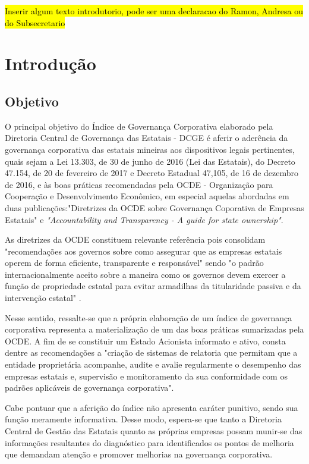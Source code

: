 \hl{Inserir algum texto introdutorio, pode ser uma declaracao do Ramon, Andresa ou do Subsecretario}
	
	
\chapter{Introdução}
\label{chp:intro}
	
\section{Objetivo}
	
O principal objetivo do Índice de Governança Corporativa elaborado pela Diretoria Central de Governança das Estatais - DCGE é aferir o aderência da governança corporativa das estatais mineiras aos dispositivos legais pertinentes, quais sejam a Lei 13.303, de 30 de junho de 2016 (Lei das Estatais), do Decreto 47.154, de 20 de fevereiro de 2017 e Decreto Estadual 47,105, de 16 de dezembro de 2016, e às boas práticas recomendadas pela OCDE - Organização para Cooperação e Desenvolvimento Econômico, em especial aquelas abordadas em duas publicações:"Diretrizes da OCDE sobre Governança Coporativa de Empresas Estatais" e \textit{"Accountability and Transparency - A guide for state ownership"}.
	
As diretrizes da OCDE constituem relevante referência pois consolidam "recomendações aos governos sobre como assegurar que as empresas estatais operem de forma eficiente, transparente e responsável" sendo "o padrão internacionalmente aceito sobre a maneira como os governos devem exercer a função de propriedade estatal para evitar armadilhas da titularidade passiva e da intervenção estatal" \citep[p.~7]{ocde-diretrizes}. 
	
Nesse sentido, ressalte-se que a própria elaboração de um índice de governança corporativa representa a materialização de um das boas práticas sumarizadas pela OCDE. A fim de se constituir um Estado Acionista informato e ativo, consta dentre as recomendações a "criação de sistemas de relatoria que permitam que a entidade proprietária acompanhe, audite e avalie regularmente o desempenho das empresas estatais e, supervisão e monitoramento da sua conformidade com os padrões aplicáveis de governança corporativa".\citep[p.~21]{ocde-diretrizes}

Cabe pontuar que a aferição do índice não apresenta caráter punitivo, sendo sua função meramente informativa. Desse modo, espera-se que tanto a Diretoria Central de Gestão das Estatais quanto as próprias empresas possam munir-se das informações resultantes do diagnóstico para identificados os pontos de melhoria que demandam atenção e promover melhorias na governança corporativa. 
	
